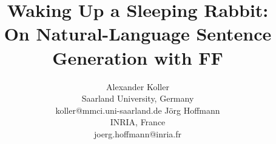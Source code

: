 \documentclass[letterpaper]{article}
\begin{document}
\title{Waking Up a Sleeping Rabbit:\\ On Natural-Language Sentence Generation with FF}

\author{
Alexander Koller \\ Saarland University, Germany \\ koller@mmci.uni-saarland.de
\And
J\"org Hoffmann \\ INRIA, France \\ joerg.hoffmann@inria.fr
}


\maketitle










{\small


}
\end{document}
